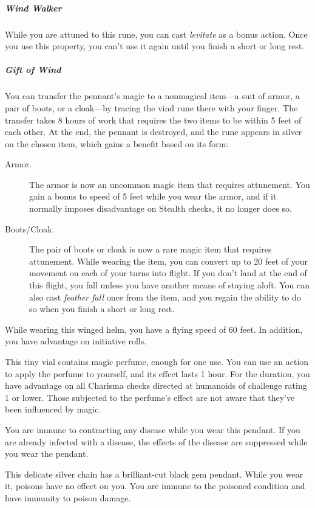 \documentclass[10pt,a4paper,twoside,bg=print,twocolumn,openany,nodeprecatedcode]{dndbook}
\begin{document}
\subparagraph{Wind Walker}
While you are attuned to this rune, you can cast \textit{levitate} as a bonus action. Once you use this property, you can't use it again until you finish a short or long rest.

\subparagraph{Gift of Wind}
You can transfer the pennant's magic to a nonmagical item—a suit of armor, a pair of boots, or a cloak—by tracing the vind rune there with your finger. The transfer takes 8 hours of work that requires the two items to be within 5 feet of each other. At the end, the pennant is destroyed, and the rune appears in silver on the chosen item, which gains a benefit based on its form:


\begin{description}
\item[Armor.]
The armor is now an uncommon magic item that requires attunement. You gain a bonus to speed of 5 feet while you wear the armor, and if it normally imposes disadvantage on Stealth checks, it no longer does so.
\item[Boots/Cloak.]
The pair of boots or cloak is now a rare magic item that requires attunement. While wearing the item, you can convert up to 20 feet of your movement on each of your turns into flight. If you don't land at the end of this flight, you fall unless you have another means of staying aloft. You can also cast \textit{feather fall} once from the item, and you regain the ability to do so when you finish a short or long rest.
\end{description}

While wearing this winged helm, you have a flying speed of 60 feet. In addition, you have advantage on initiative rolls.

This tiny vial contains magic perfume, enough for one use. You can use an action to apply the perfume to yourself, and its effect lasts 1 hour. For the duration, you have advantage on all Charisma checks directed at humanoids of challenge rating 1 or lower. Those subjected to the perfume's effect are not aware that they've been influenced by magic.

You are immune to contracting any disease while you wear this pendant. If you are already infected with a disease, the effects of the disease are suppressed while you wear the pendant.

This delicate silver chain has a brilliant-cut black gem pendant. While you wear it, poisons have no effect on you. You are immune to the poisoned condition and have immunity to poison damage.
\end{document}
